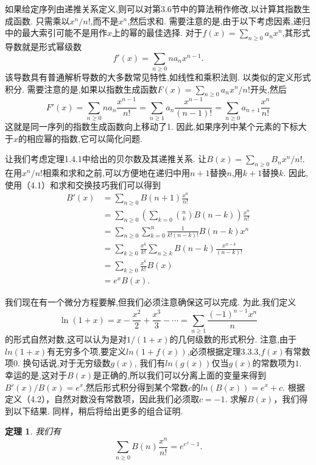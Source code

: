 \documentclass[a4paper,12pt]{ctexbook}
\newtheorem{theorem}[lemma]{\hspace{2em}定理}%
\begin{document}
如果给定序列由递推关系定义,则可以对第3.6节中的算法稍作修改,以计算其指数生成函数.  只需乘以\(x^{n}/n!\),而不是$x^{n}$,然后求和.  需要注意的是,由于以下考虑因素,递归中的最大索引可能不是用作$x$上的幂的最佳选择.  对于$f(x)=\sum_{n\ge0}a_{n}x^n$,其{\kaishu 形式导数}就是形式幂级数$${f}'(x)=\sum_{n\ge0}na_{n}x^{n-1}. $$
该导数具有普通解析导数的大多数常见特性,如线性和乘积法则.  以类似的定义形式积分.  需要注意的是,如果以指数生成函数$F(x)=\sum_{n\ge0}a_{n}x^{n}/{n!}$开头,然后
\begin{equation}
{F}'(x)=\sum_{n\ge0}na_{n}\frac{x^{n-1}}{n!}
=\sum_{n\ge1}a_{n}\frac{x^{n-1}}{(n-1)!}
=\sum_{n\ge0}a_{n+1}\frac{x^{n}}{n!}
\end{equation}
这就是同一序列的指数生成函数向上移动了1.  因此,如果序列中某个元素的下标大于$x$的相应幂的指数,它可以简化问题.  

让我们考虑定理1.4.1中给出的贝尔数及其递推关系.  让$B(x)=\sum_{n\ge0}B_nx^{n}/{n!}$.  在用\(x^{n}/n!\)相乘和求和之前,可以方便地在递归中用$n+1$替换$n$,用$k+1$替换$k$.  因此,使用（4.1）和求和交换技巧我们可以得到
\begin{align*}
{B}'(x)
&=\sum_{n\ge0}B(n+1)\frac{x^{n}}{n!}\\
&=\sum_{n\ge0}\left(\sum_{k=0}\binom{n}{k}B(n-k)\right)\frac{x^{n}}{n!}\\
&=\sum_{n\ge0}\sum_{k=0}^n\frac{1}{k!(n-k)!}B(n-k)x^{n}\\
&=\sum_{k\ge0}\frac{x^k}{k!}\sum_{n\ge k}B(n-k)\frac{x^{n-k}}{(n-k)!}\\
&=\sum_{k\ge0}\frac{x^k}{k!}B(x)\\
&=e^xB(x). 
\end{align*}

我们现在有一个微分方程要解,但我们必须注意确保这可以完成.  为此,我们定义
\begin{equation}
\ln(1+x)=x-\frac{x^2}{2}+\frac{x^3}{3}-\cdots =\sum_{n\ge1}\frac{(-1)^{n-1}x^n}{n}
\end{equation}
的{\kaishu 形式自然对数},这可以认为是对$1/(1+x)$的几何级数的形式积分. 注意,由于$ln(1+x)$有无穷多个项,要定义$ln(1+f(x))$,必须根据定理3.3.3,$f(x)$有常数项$0$. 换句话说,对于无穷级数$g(x)$, 我们有$ln(g(x))$仅当$g(x)$的常数项为$1$.  幸运的是,这对于$B(x)$是正确的,所以我们可以分离上面的变量来得到${B}'(x)/B(x)=e^x$,然后形式积分得到某个常数$c$的$ln(B(x))=e^x+c$. 根据定义（4.2），自然对数没有常数项，因此我们必须取$c=-1$.  求解$B(x)$，我们得到以下结果.  同样，稍后将给出更多的组合证明.  
\begin{theorem}
 	我们有
 	$$
 	\sum_{n\ge0}B(n)\frac{x^{n}}{n!}=e^{e^{x}-1}. 
 	$$
\end{theorem}
\end{document}

